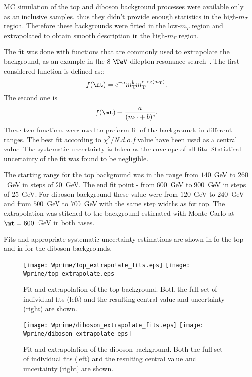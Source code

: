 MC simulation of the top and diboson background processes were available only as an inclusive samples,
thus they didn't provide enough statistics in the high-$m_T$ region.
Therefore these backgrounds were fitted in the low-$m_T$ region and extrapolated to obtain smooth description in the high-$m_T$ region.

The fit was done with functions that are commonly used to extrapolate the background, as an example in the $8~\TeV$ dilepton resonance search~\cite{Aad:2014cka}.
The first considered function is defined as::
\begin{equation}
 f(\mt) = e^{-a} m_\mathrm{T}^{b} m_\mathrm{T}^{c \log(m_\mathrm{T})}.
  \label{eq:dijetfunc}
\end{equation}
The second one is:
\begin{equation}
 f(\mt) = \frac{a}{(m_\mathrm{T}+b)^{c}}.
  \label{eq:powerlaw}
\end{equation}
These two functions were used to preform fit of the backgrounds in different ranges. 
The best fit according to $\chi^{2}/N.d.o.f$ value have been used as a central value.
The systematic uncertainty is taken as the envelope of all fits.
Statistical uncertainty of the fit was found to be negligible.

The starting range for the top background was in the range from $140$~GeV to $260$~GeV in steps of $20$~GeV. The end fit point - from $600$~GeV to $900$~GeV in steps of $25$~GeV.
For diboson background these value were from $120$~GeV to $240$~GeV and from $500$~GeV to $700$~GeV with the same step widths as for top.
The extrapolation was stitched to the background estimated with Monte Carlo at $\mt=600$~GeV in both cases.

Fits and appropriate systematic uncertainty estimations are shown in 
 fo the top and in  for the diboson backgrounds.
\begin{figure}[!htb]
  \centering
  \texttt{[image: Wprime/top\_extrapolate\_fits.eps]}
  \texttt{[image: Wprime/top\_extrapolate.eps]}
  \caption{Fit and extrapolation of the top background. Both the full set of individual
fits (left) and the resulting central value and uncertainty (right) are shown.}
  \label{fig:mu_extrapolate_top}
\end{figure}
\begin{figure}[!htb]
  \centering
  \texttt{[image: Wprime/diboson\_extrapolate\_fits.eps]}
  \texttt{[image: Wprime/diboson\_extrapolate.eps]}
  \caption{Fit and extrapolation of the diboson background. Both the full set of individual
fits (left) and the resulting central value and uncertainty (right) are shown.}
  \label{fig:mu_extrapolate_diboson}
\end{figure}


